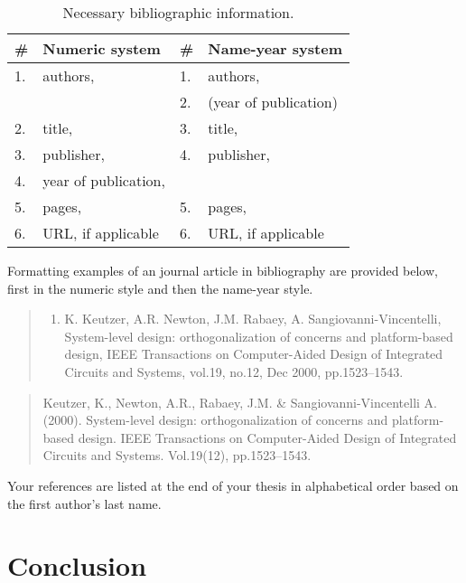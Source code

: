\documentclass[twoside,draftfooter]{tutthesis} %
\begin{document}
\begin{table}[ht!]
\caption{Necessary bibliographic information.}
\label{tab:bibliographic-information}
\begin{tabular}{l l | l l}
\hline
\textbf{\#} & \textbf{Numeric system} & \# & \textbf{Name-year system} \\
\hline \hline
1. & authors, & 1. & authors,\\
& & 2. & (year of publication) \\
2. & title, & 3. & title, \\
3. & publisher, & 4. & publisher, \\
4. & year of publication, & \\
5. & pages, & 5. & pages, \\
6. & URL, if applicable & 6. & URL, if applicable \\
\hline
\end{tabular}
\end{table}

Formatting examples of an journal article in bibliography are provided below, first in the numeric style and then the name-year style.

\begin{quotation}
\small
\begin{enumerate}
  \renewcommand*\labelenumi{[\theenumi]}
  \setcounter{enumi}{99}
  \item K. Keutzer, A.R. Newton, J.M. Rabaey, A. Sangiovanni-Vincentelli, System-level design: orthogonalization of concerns and platform-based design, IEEE Transactions on Computer-Aided Design of Integrated Circuits and Systems, vol.19, no.12, Dec 2000, pp.1523--1543.
\end{enumerate}
\end{quotation}

\begin{quotation}
Keutzer, K., Newton, A.R., Rabaey, J.M. \& Sangiovanni-Vincentelli A. (2000). System-level design: orthogonalization of concerns and platform-based design. IEEE Transactions on Computer-Aided Design of Integrated Circuits and Systems. Vol.19(12), pp.1523--1543.
\end{quotation}

Your references are listed at the end of your thesis in alphabetical order based on the first author's last name.



\chapter{Conclusion}
\label{ch:conclusion}
\end{document}

